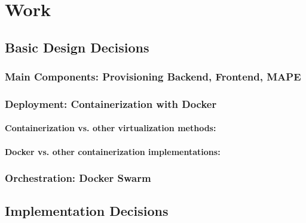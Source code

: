 \documentclass{seal_thesis}
\begin{document}
\chapter{Work}


\section{Basic Design Decisions}

\subsection{Main Components: Provisioning Backend, Frontend, MAPE}

\subsection{Deployment: Containerization with Docker}
\subsubsection{Containerization vs. other virtualization methods:}
\subsubsection{Docker vs. other containerization implementations:}

\subsection{Orchestration: Docker Swarm}


\section{Implementation Decisions}
\end{document}
